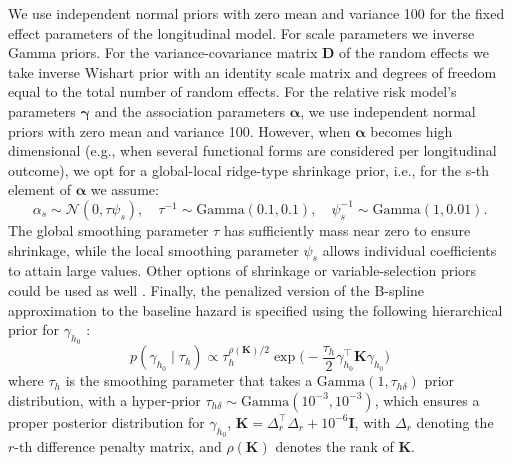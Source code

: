 We use independent normal priors with zero mean and variance 100 for the fixed effect parameters of the longitudinal model. For scale parameters we inverse Gamma priors. For the variance-covariance matrix $\boldsymbol{D}$ of the random effects we take inverse Wishart prior with an identity scale matrix and degrees of freedom equal to the total number of random effects. For the relative risk model's parameters $\boldsymbol{\gamma}$ and the association parameters $\boldsymbol{\alpha}$, we use independent normal priors with zero mean and variance 100. However, when $\boldsymbol{\alpha}$ becomes high dimensional (e.g., when several functional forms are considered per longitudinal outcome), we opt for a global-local ridge-type shrinkage prior, i.e., for the s-th element of $\boldsymbol{\alpha}$ we assume:
\begin{equation}
\alpha_s \sim \mathcal{N}(0, \tau \psi_s), \quad \tau^{-1} \sim \mbox{Gamma} (0.1,0.1), \quad \psi_s^{-1} \sim \mbox{Gamma}(1, 0.01).
\end{equation}
The global smoothing parameter $\tau$ has sufficiently mass near zero to ensure shrinkage, while the local smoothing parameter $\psi_s$ allows individual coefficients to attain large values. Other options of shrinkage or variable-selection priors could be used as well \citep{andrinopoulou2016bayesian}. Finally, the penalized version of the B-spline approximation to the
baseline hazard is specified using the following hierarchical prior for $\gamma_{h_0}$ \citep{lang2004bayesian}:
\begin{equation}
p(\gamma_{h_0} \mid \tau_h) \propto \tau_h^{\rho(\boldsymbol{K})/2} \exp\Big(-\frac{\tau_h}{2}\gamma_{h_0}^{\top}\boldsymbol{K}\gamma_{h_0}\Big)
\end{equation}
where $\tau_h$ is the smoothing parameter that takes a $\mbox{Gamma}(1, \tau_{h\delta})$ prior distribution, with a hyper-prior $\tau_{h\delta} \sim \mbox{Gamma}(10^{-3}, 10^{-3})$, which ensures a proper posterior distribution for $\gamma_{h_0}$\citep{jullion2007robust}, $\boldsymbol{K} = \Delta_r^{\top} \Delta_r + 10^{-6} \boldsymbol{I}$, with $\Delta_r$ denoting the ${r\mbox{-th}}$ difference penalty matrix, and $\rho(\boldsymbol{K})$ denotes the rank of $\boldsymbol{K}$.